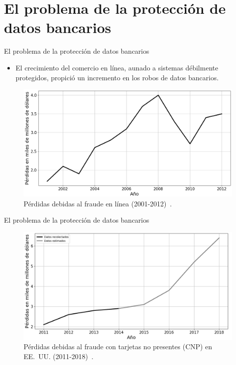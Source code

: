 %
%

\section{El problema de la protección de datos bancarios}

\begin{frame}{El problema de la protección de datos bancarios}
  \begin{itemize}
    \item El crecimiento del comercio en línea, aunado a sistemas débilmente
      protegidos, propició un incremento en los robos de datos bancarios.
  \end{itemize}
  \begin{figure}
    \centering
    \includegraphics[width=0.85\linewidth]
       {diagramas_comunes/estadisticas_fraudes/perdidas_fraude_2002_2012.png}
    \caption{Pérdidas debidas al fraude en línea (2001-2012)~\cite{wallethub}.}
  \end{figure}
\end{frame}

\begin{frame}{El problema de la protección de datos bancarios}
  \begin{figure}
    \centering
    \includegraphics[width=1\linewidth]
       {diagramas_comunes/estadisticas_fraudes/perdidas_fraude_2011_2018.png}
    \caption{Pérdidas debidas al fraude con tarjetas no presentes (CNP) en
              EE.~UU. (2011-2018)~\cite{creditcards}.}
  \end{figure}
\end{frame}

